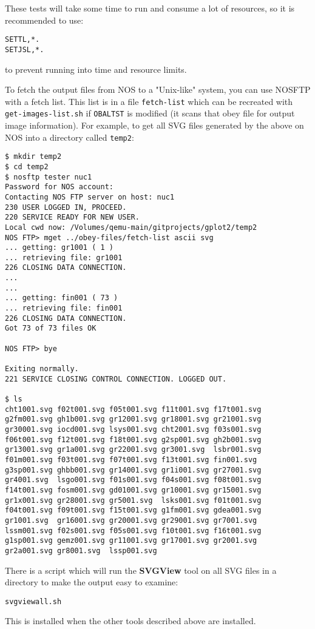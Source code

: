 \documentclass[a4paper,twoside,11pt]{article}
\newcommand{\newpara}{\par\vspace{4mm}\noindent}
\begin{document}
\newpara
These tests will take some time to run and consume a lot of resources, so
it is recommended to use:
\begin{lstlisting}
SETTL,*.
SETJSL,*.
\end{lstlisting}
to prevent running into time and resource limits.

\newpara
To fetch the output files from NOS to a "Unix-like" system, you can use NOSFTP
with a fetch list. This list is in a file \texttt{fetch-list} which can be recreated
with \texttt{get-images-list.sh} if \texttt{OBALTST} is modified (it scans that obey file for
output image information). For example, to get all SVG files generated by the above
on NOS into a directory called \texttt{temp2}:
\begin{lstlisting}
$ mkdir temp2
$ cd temp2
$ nosftp tester nuc1
Password for NOS account: 
Contacting NOS FTP server on host: nuc1
230 USER LOGGED IN, PROCEED.
220 SERVICE READY FOR NEW USER.
Local cwd now: /Volumes/qemu-main/gitprojects/gplot2/temp2
NOS FTP> mget ../obey-files/fetch-list ascii svg
... getting: gr1001 ( 1 )
... retrieving file: gr1001
226 CLOSING DATA CONNECTION.
...
...
... getting: fin001 ( 73 )
... retrieving file: fin001
226 CLOSING DATA CONNECTION.
Got 73 of 73 files OK

NOS FTP> bye

Exiting normally.
221 SERVICE CLOSING CONTROL CONNECTION. LOGGED OUT.

$ ls
cht1001.svg f02t001.svg f05t001.svg f11t001.svg f17t001.svg	
g2fm001.svg gh1b001.svg gr12001.svg gr18001.svg gr21001.svg	
gr30001.svg iocd001.svg lsys001.svg cht2001.svg f03s001.svg	
f06t001.svg f12t001.svg f18t001.svg g2sp001.svg gh2b001.svg	
gr13001.svg gr1a001.svg gr22001.svg gr3001.svg  lsbr001.svg
f01m001.svg f03t001.svg f07t001.svg f13t001.svg fin001.svg	
g3sp001.svg ghbb001.svg gr14001.svg gr1i001.svg gr27001.svg	
gr4001.svg  lsgo001.svg f01s001.svg f04s001.svg f08t001.svg	
f14t001.svg fosm001.svg gd01001.svg gr10001.svg gr15001.svg	
gr1x001.svg gr28001.svg gr5001.svg  lsks001.svg f01t001.svg	
f04t001.svg f09t001.svg f15t001.svg g1fm001.svg gdea001.svg	
gr1001.svg  gr16001.svg gr20001.svg gr29001.svg gr7001.svg	
lssm001.svg f02s001.svg f05s001.svg f10t001.svg f16t001.svg	
g1sp001.svg gemz001.svg gr11001.svg gr17001.svg gr2001.svg	
gr2a001.svg gr8001.svg  lssp001.svg
\end{lstlisting}

\newpara
There is a script which will run the \textbf{SVGView} tool on all SVG
files in a directory to make the output easy to examine:
\begin{lstlisting}
svgviewall.sh
\end{lstlisting}
This is installed when the other tools described above are
installed.
\end{document}
